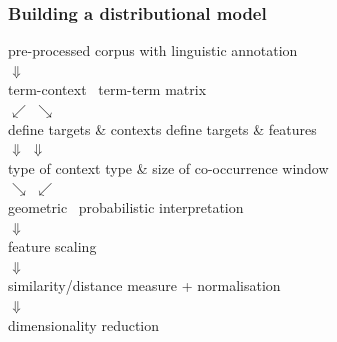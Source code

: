 \documentclass[t]{beamer} %
\begin{document}
\begin{frame}
  \frametitle{Building a distributional model}

  \ungap[2]
  \begin{center}
    pre-processed corpus with linguistic annotation\\
    \pause $\Downarrow$\\
    term-context \vs\ term-term matrix\\
    \pause $\swarrow$ \hspace{3cm} $\searrow$\\
    define targets \& contexts \hspace{2cm} define targets \& features\\
    \pause $\Downarrow$ \hspace{6cm} $\Downarrow$ \\
    \hspace{.5cm} type of context \hspace{1.5cm} type \& size of co-occurrence window\\
    \pause $\searrow$ \hspace{3cm} $\swarrow$\\
    geometric \vs\ probabilistic interpretation\\
    \pause $\Downarrow$\\
    feature scaling\\
    \pause $\Downarrow$\\
    similarity/distance measure + normalisation\\
    \pause $\Downarrow$\\
    dimensionality reduction
  \end{center}
\end{frame}
\end{document}
